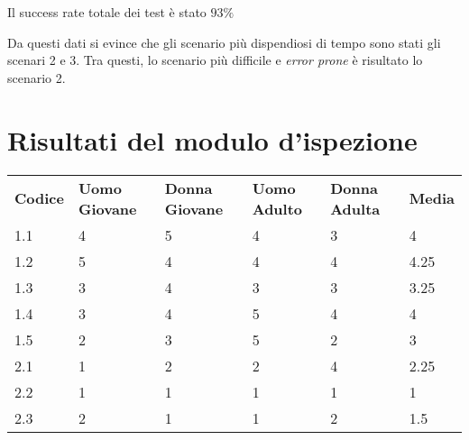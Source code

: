 \documentclass[12pt,a4paper,oneside]{report}
\begin{document}
\vspace{1cm}

Il success rate totale dei test è stato $ 93\% $

\vspace{1cm}

Da questi dati si evince che gli scenario più dispendiosi di tempo sono stati gli scenari 2 e 3. Tra questi, lo scenario più difficile e \textit{error prone} è risultato lo scenario 2.

\newpage

\section{Risultati del modulo d'ispezione}

{\centering

\begin{tabular}{p{2cm}p{2cm}p{2cm}p{2cm}p{2cm}l} 
	\toprule
	\textbf{Codice}  & \textbf{Uomo Giovane} & \textbf{Donna Giovane} & \textbf{Uomo Adulto} & \textbf{Donna Adulta} & \textbf{Media}  \\
	1.1              & 4                     & 5                      & 4                     & 3                      & 4               \\
	1.2              & 5                     & 4                      & 4                     & 4                      & 4.25            \\
	1.3              & 3                     & 4                      & 3                     & 3                      & 3.25            \\
	1.4              & 3                     & 4                      & 5                     & 4                      & 4               \\
	1.5              & 2                     & 3                      & 5                     & 2                      & 3               \\
	2.1              & 1                     & 2                      & 2                     & 4                      & 2.25            \\
	2.2              & 1                     & 1                      & 1                     & 1                      & 1               \\
	2.3              & 2                     & 1                      & 1                     & 2                      & 1.5             \\

\end{tabular}}
\end{document}
